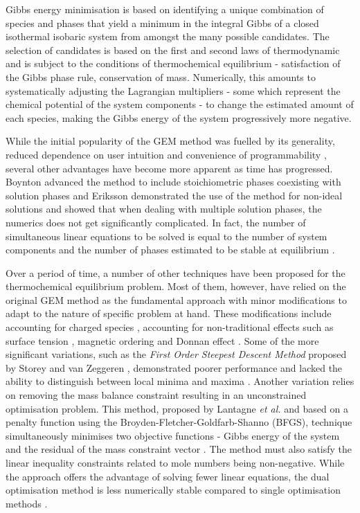 	Gibbs energy minimisation is based on identifying a unique combination of species and phases that yield a minimum in the integral Gibbs of a closed isothermal isobaric system from amongst the many possible candidates. The selection of candidates is based on the first and second laws of thermodynamic and is subject to the conditions of thermochemical equilibrium - satisfaction of the Gibbs phase rule, conservation of mass. Numerically, this amounts to systematically adjusting the Lagrangian multipliers - some which represent the chemical potential of the system components - to change the estimated amount of each species, making the Gibbs energy of the system progressively more negative.
	
	While the initial popularity of the GEM method was fuelled by its generality,  reduced dependence on user intuition and convenience of programmability \cite{Zeleznik:1968aa}, several other advantages have become more apparent as time has progressed. Boynton advanced the method to include stoichiometric phases coexisting with solution phases \cite{Boynton:1960aa} and Eriksson \cite{Eriksson:1975aa} demonstrated the use of the method for non-ideal solutions and showed that when dealing with multiple solution phases, the numerics does not get significantly complicated. In fact, the number of simultaneous linear equations to be solved is equal to the number of system components and the number of phases estimated to be stable at equilibrium \cite{vanZeggeren11,Boynton:1960aa,Eriksson:1975aa,Eriksson73}.
	
	Over a period of time, a number of other techniques have been proposed for the thermochemical equilibrium problem. Most of them, however, have relied on the original GEM method \cite{White:58} as the fundamental approach with minor modifications to adapt to the nature of specific problem at hand. These modifications include accounting for charged species \cite{ERIKSSON1979375}, accounting for non-traditional effects such as surface tension \cite{KOUKKARI200618}, magnetic ordering \cite{Eriksson90} and Donnan effect \cite{PAJARRE200658}. Some of the more significant variations, such as the \emph{First Order Steepest Descent Method} proposed by Storey and van Zeggeren \cite{Storey:1964aa}, demonstrated poorer performance and lacked the ability to distinguish between local minima and maxima \cite{Storey:1964aa,vanZeggeren11}. Another variation relies on removing the mass balance constraint resulting in an unconstrained optimisation problem. This method, proposed by Lantagne \textit{et al.} and based on a penalty function using the Broyden-Fletcher-Goldfarb-Shanno (BFGS), technique simultaneously minimises two objective functions - Gibbs energy of the system and the residual of the mass constraint vector \cite{LANTAGNE1988589,Nocedal06}. The method must also satisfy the linear inequality constraints related to mole numbers being non-negative. While the approach offers the advantage of solving fewer linear equations, the dual optimisation method is less numerically stable compared to single optimisation methods \cite{Nocedal06}.
	
